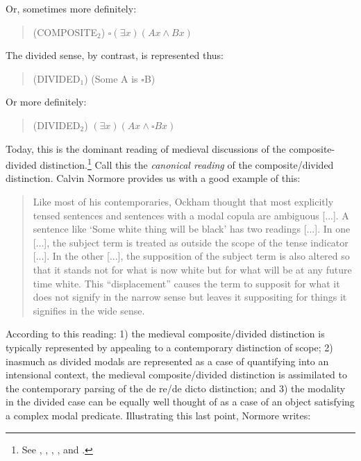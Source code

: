 \documentclass[a4paper]{article}
\begin{document}
\noindent Or, sometimes more definitely:

\begin{quote}
(COMPOSITE$_{2}$) $\square(\exists x)(Ax \wedge Bx)$
\end{quote}

The divided sense, by contrast, is represented thus:

\begin{quote}
(DIVIDED$_{1}$) (Some A is $\square$B)
\end{quote}

\noindent Or more definitely:

\begin{quote}
(DIVIDED$_{2}$) $(\exists x)(Ax \wedge \square Bx)$
\end{quote}

Today, this is the dominant reading of medieval discussions of the composite-divided distinction.\footnote{See \cite{PriestRead1981}, \cite{Read2007}, \cite[p. 350]{DutilhNovaes2007}, \cite[p. 298]{Parsons2014}, and \cite[pp. 237-238]{Johnston2015}.} Call this the \textit{canonical reading} of the composite/divided distinction. Calvin Normore provides us with a good example of this:

\begin{quote}
Like most of his contemporaries, Ockham thought that most explicitly tensed sentences and sentences with a modal copula are ambiguous [...]. A sentence like `Some white thing will be black' has two readings [...]. In one [...], the subject term is treated as outside the scope of the tense indicator [...]. In the other [...], the supposition of the subject term is also altered so that it stands not for what is now white but for what will be at any future time white. This “displacement” causes the term to supposit for what it does not signify in the narrow sense but leaves it suppositing for things it signifies in the wide sense. \cite[pp. 39-40]{Normore1999}
\end{quote}


According to this reading: 1) the medieval composite/divided distinction is typically represented by appealing to a contemporary distinction of scope; 2) inasmuch as divided modals are represented as a case of quantifying into an intensional context, the medieval composite/divided distinction is assimilated to the contemporary parsing of the de re/de dicto distinction;  and 3) the modality in the divided case can be equally well thought of as a case of an object satisfying a complex modal predicate. Illustrating this last point, Normore writes: 
\end{document}
